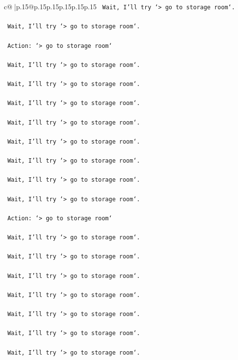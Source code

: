\documentclass{article}
\begin{document}
{\begin{supertabular}{c@{$\;$}|p{.15\linewidth}@{}p{.15\linewidth}p{.15\linewidth}p{.15\linewidth}p{.15\linewidth}p{.15\linewidth}}
{{{\texttt{    Wait, I'll try `> go to storage room`.} \\
\\ 
\texttt{    Wait, I'll try `> go to storage room`.} \\
\\ 
\texttt{    Action: `> go to storage room`} \\
\\ 
\texttt{    Wait, I'll try `> go to storage room`.} \\
\\ 
\texttt{    Wait, I'll try `> go to storage room`.} \\
\\ 
\texttt{    Wait, I'll try `> go to storage room`.} \\
\\ 
\texttt{    Wait, I'll try `> go to storage room`.} \\
\\ 
\texttt{    Wait, I'll try `> go to storage room`.} \\
\\ 
\texttt{    Wait, I'll try `> go to storage room`.} \\
\\ 
\texttt{    Wait, I'll try `> go to storage room`.} \\
\\ 
\texttt{    Wait, I'll try `> go to storage room`.} \\
\\ 
\texttt{    Action: `> go to storage room`} \\
\\ 
\texttt{    Wait, I'll try `> go to storage room`.} \\
\\ 
\texttt{    Wait, I'll try `> go to storage room`.} \\
\\ 
\texttt{    Wait, I'll try `> go to storage room`.} \\
\\ 
\texttt{    Wait, I'll try `> go to storage room`.} \\
\\ 
\texttt{    Wait, I'll try `> go to storage room`.} \\
\\ 
\texttt{    Wait, I'll try `> go to storage room`.} \\
\\ 
\texttt{    Wait, I'll try `> go to storage room`.} \\
\\ 
}}}
\end{supertabular}}
\end{document}
